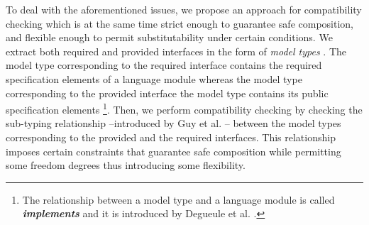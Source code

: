 To deal with the aforementioned issues, we propose an approach for compatibility checking which is at the same time strict enough to guarantee safe composition, and flexible enough to permit substitutability under certain conditions. We extract both required and provided interfaces in the form of \textit{model types} \cite{Steel:2007}. The model type corresponding to the required interface contains the required specification elements of a language module whereas the model type corresponding to the provided interface the model type contains its public specification elements \footnote{The relationship between a model type and a language module is called \textsl{\textbf{implements}} and it is introduced by Degueule et al. \cite{Degueule:2015a}.}. Then, we perform compatibility checking by checking the sub-typing relationship --introduced by Guy et al. \cite{Guy:2012}-- between the model types corresponding to the provided and the required interfaces. This relationship imposes certain constraints that guarantee safe composition while permitting some freedom degrees thus introducing some flexibility. %



